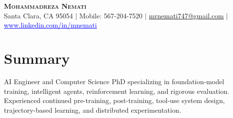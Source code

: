 \documentclass[letterpaper,13pt]{article}
\begin{document}
\begin{center}
    \textbf{\LARGE \scshape Mohammadreza Nemati} \\ \vspace{1pt}
    \small Santa Clara, CA 95054 $|$ Mobile: 567-204-7520 $|$
    \href{mailto:mrnemati747@gmail.com}{mrnemati747@gmail.com} $|$
    \href{https://www.linkedin.com/in/mnemati/}{\textcolor{blue}{\underline{www.linkedin.com/in/mnemati}}}
\end{center}

\section{Summary}
\small{AI Engineer and Computer Science PhD specializing in foundation-model training, intelligent agents, reinforcement learning, and rigorous evaluation. Experienced continued pre-training, post-training, tool-use system design, trajectory-based learning, and distributed experimentation.}
\vspace{0.05cm}
\end{document}
